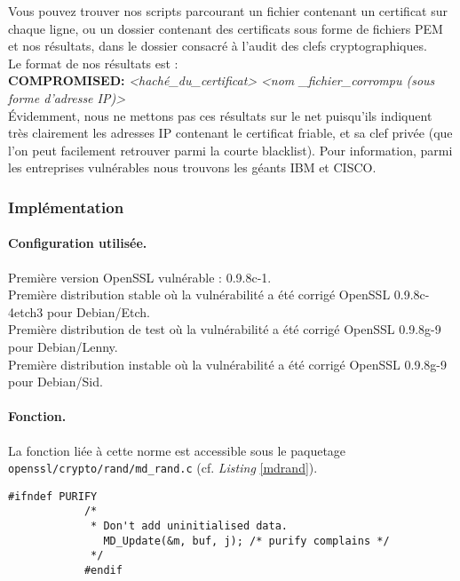 			Vous pouvez trouver nos scripts parcourant un fichier contenant un certificat sur chaque ligne, ou un dossier contenant des certificats sous forme de fichiers PEM et nos résultats, dans le dossier consacré à l'audit des clefs cryptographiques.\\
			
			Le format de nos résultats est : \\
			
			\textbf{COMPROMISED:} \textit{<haché\_du\_certificat>} \textit{<nom \_fichier\_corrompu (sous forme d'adresse IP)>}\\
			
			Évidemment, nous ne mettons pas ces résultats sur le net puisqu'ils indiquent très clairement les adresses IP contenant le certificat friable, et sa clef privée (que l'on peut facilement retrouver parmi la courte blacklist). Pour information, parmi les entreprises vulnérables nous trouvons les géants IBM et CISCO.
	
		\subsubsection{Implémentation}
						
			\paragraph{Configuration utilisée.\\}
			
			Première version OpenSSL vulnérable : 0.9.8c-1.\\
			Première distribution stable où la vulnérabilité a été corrigé OpenSSL 0.9.8c-4etch3 pour Debian/Etch.\\	
			Première distribution de test où la vulnérabilité a été corrigé OpenSSL 0.9.8g-9 pour Debian/Lenny.\\
			Première distribution instable où la vulnérabilité a été corrigé OpenSSL 0.9.8g-9 pour Debian/Sid.\\
			
						
			\paragraph{Fonction.\\} 
			
			La fonction liée à cette norme est accessible sous le paquetage \texttt{openssl/crypto/rand/md\_rand.c} (cf. \textit{Listing} \ref{mdrand}). 
			
			\begin{lstlisting}[style=customc,caption=md\_rand.c, label=mdrand]
			#ifndef PURIFY
			/*
			 * Don't add uninitialised data.
			   MD_Update(&m, buf, j); /* purify complains */
			 */
			#endif
			\end{lstlisting}
			
